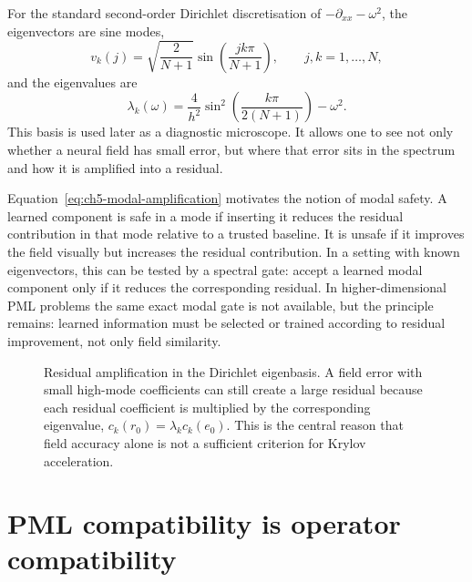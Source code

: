 For the standard second-order Dirichlet discretisation of
$-\partial_{xx}-\omega^2$, the eigenvectors are sine modes,
\begin{equation}
    v_k(j)
    =
    \sqrt{\frac{2}{N+1}}
    \sin\!\left(\frac{jk\pi}{N+1}\right),
    \qquad
    j,k=1,\dots,N,
    \label{eq:ch5-dirichlet-eigenvectors}
\end{equation}
and the eigenvalues are
\begin{equation}
    \lambda_k(\omega)
    =
    \frac{4}{h^2}
    \sin^2\!\left(\frac{k\pi}{2(N+1)}\right)
    -
    \omega^2.
    \label{eq:ch5-dirichlet-eigenvalues}
\end{equation}
This basis is used later as a diagnostic microscope. It allows one to see not
only whether a neural field has small error, but where that error sits in the
spectrum and how it is amplified into a residual.

Equation~\eqref{eq:ch5-modal-amplification} motivates the notion of modal
safety. A learned component is safe in a mode if inserting it reduces the
residual contribution in that mode relative to a trusted baseline. It is
unsafe if it improves the field visually but increases the residual
contribution. In a setting with known eigenvectors, this can be tested by a
spectral gate: accept a learned modal component only if it reduces the
corresponding residual. In higher-dimensional PML problems the same exact
modal gate is not available, but the principle remains: learned information
must be selected or trained according to residual improvement, not only field
similarity.

\begin{figure}[htbp]
    \centering
    \caption{Residual amplification in the Dirichlet eigenbasis. A field error
    with small high-mode coefficients can still create a large residual
    because each residual coefficient is multiplied by the corresponding
    eigenvalue, $c_k(r_0)=\lambda_k c_k(e_0)$. This is the central reason that
    field accuracy alone is not a sufficient criterion for Krylov
    acceleration.}
    \label{fig:ch5-modal-amplification-cartoon}
\end{figure}

\section{PML compatibility is operator compatibility}
\label{sec:ch5-pml}

